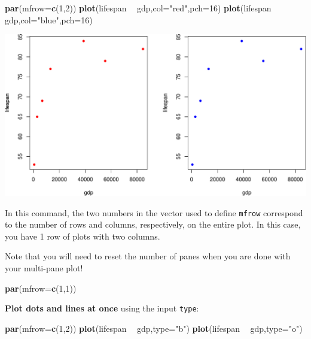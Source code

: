 \documentclass[
]{book}
\newenvironment{Shaded}{\begin{snugshade}}{\end{snugshade}}
\newcommand{\DataTypeTok}[1]{\textcolor[rgb]{0.13,0.29,0.53}{#1}}
\newcommand{\DecValTok}[1]{\textcolor[rgb]{0.00,0.00,0.81}{#1}}
\newcommand{\KeywordTok}[1]{\textcolor[rgb]{0.13,0.29,0.53}{\textbf{#1}}}
\newcommand{\NormalTok}[1]{#1}
\newcommand{\OperatorTok}[1]{\textcolor[rgb]{0.81,0.36,0.00}{\textbf{#1}}}
\newcommand{\StringTok}[1]{\textcolor[rgb]{0.31,0.60,0.02}{#1}}
\begin{document}
\begin{Shaded}
\begin{Highlighting}[]
\KeywordTok{par}\NormalTok{(}\DataTypeTok{mfrow=}\KeywordTok{c}\NormalTok{(}\DecValTok{1}\NormalTok{,}\DecValTok{2}\NormalTok{))}
\KeywordTok{plot}\NormalTok{(lifespan }\OperatorTok{~}\StringTok{ }\NormalTok{gdp,}\DataTypeTok{col=}\StringTok{"red"}\NormalTok{,}\DataTypeTok{pch=}\DecValTok{16}\NormalTok{)}
\KeywordTok{plot}\NormalTok{(lifespan }\OperatorTok{~}\StringTok{ }\NormalTok{gdp,}\DataTypeTok{col=}\StringTok{"blue"}\NormalTok{,}\DataTypeTok{pch=}\DecValTok{16}\NormalTok{)}
\end{Highlighting}
\end{Shaded}

\includegraphics{figures/unnamed-chunk-235-1.pdf}

In this command, the two numbers in the vector used to define \texttt{mfrow} correspond to the number of rows and columns, respectively, on the entire plot. In this case, you have 1 row of plots with two columns.

Note that you will need to reset the number of panes when you are done with your multi-pane plot!

\begin{Shaded}
\begin{Highlighting}[]
\KeywordTok{par}\NormalTok{(}\DataTypeTok{mfrow=}\KeywordTok{c}\NormalTok{(}\DecValTok{1}\NormalTok{,}\DecValTok{1}\NormalTok{))}
\end{Highlighting}
\end{Shaded}

\textbf{Plot dots and lines at once} using the input \texttt{type}:

\begin{Shaded}
\begin{Highlighting}[]
\KeywordTok{par}\NormalTok{(}\DataTypeTok{mfrow=}\KeywordTok{c}\NormalTok{(}\DecValTok{1}\NormalTok{,}\DecValTok{2}\NormalTok{))}
\KeywordTok{plot}\NormalTok{(lifespan }\OperatorTok{~}\StringTok{ }\NormalTok{gdp,}\DataTypeTok{type=}\StringTok{"b"}\NormalTok{)}
\KeywordTok{plot}\NormalTok{(lifespan }\OperatorTok{~}\StringTok{ }\NormalTok{gdp,}\DataTypeTok{type=}\StringTok{"o"}\NormalTok{)}
\end{Highlighting}
\end{Shaded}
\end{document}
